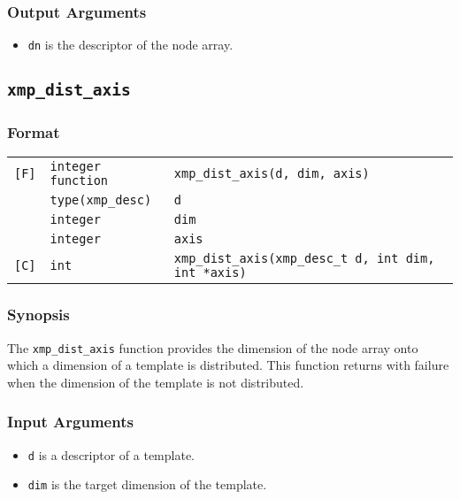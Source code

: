\subsubsection*{Output Arguments}
\begin{itemize}
 \item {\tt dn} is the descriptor of the node array.
\end{itemize}


\subsection{\tt xmp\_dist\_axis}

\subsubsection*{Format}

\begin{tabular}{lll}

\verb![F]!& {\tt integer function}& {\tt xmp\_dist\_axis(d, dim, axis)}\\
          & {\tt type(xmp\_desc)} & {\tt d}\\
          & {\tt integer} & {\tt dim}\\
          & {\tt integer} & {\tt axis}\\

\verb![C]!&  {\tt int}& {\tt xmp\_dist\_axis(xmp\_desc\_t d, int dim, int *axis)}\\

\end{tabular}

\subsubsection*{Synopsis}

The {\tt xmp\_dist\_axis} function provides the dimension of the node
array onto which a dimension of a template is distributed. This function
returns with failure when the dimension of the template is not
distributed.

\subsubsection*{Input Arguments}
\begin{itemize}
 \item {\tt d} is a descriptor of a template.
 \item {\tt dim} is the target dimension of the template.
\end{itemize}

